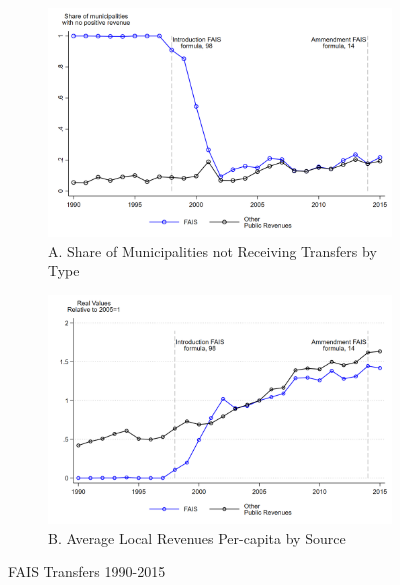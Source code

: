 \documentclass[dv_diss_main.tex]{subfiles}
\begin{document}
\begin{figure}[H] 
	\centering 
	
	\begin{subfigure}[t]{0.9\textwidth} 
		\centering
		\includegraphics[width=\linewidth]{figures/Share_FAISnonrecipients_trend.png}
		\caption*{\footnotesize A. Share of Municipalities not Receiving Transfers by Type} 
	\end{subfigure} 
	\vspace{0.1cm}
	\begin{subfigure}[t]{0.9\textwidth} 
		\centering
		\includegraphics[width=\linewidth]{figures/PerCapitaIncome_pertrack.png}
		\caption*{\footnotesize B. Average Local Revenues Per-capita by Source} 
	\end{subfigure}
	\caption{FAIS Transfers 1990-2015}\label{fig:des1A}
	\parbox{\textwidth}{\small 
		\vspace{2eX}
		\footnotesize
		\figurefaistrends 		
	}
\end{figure}
\end{document}
